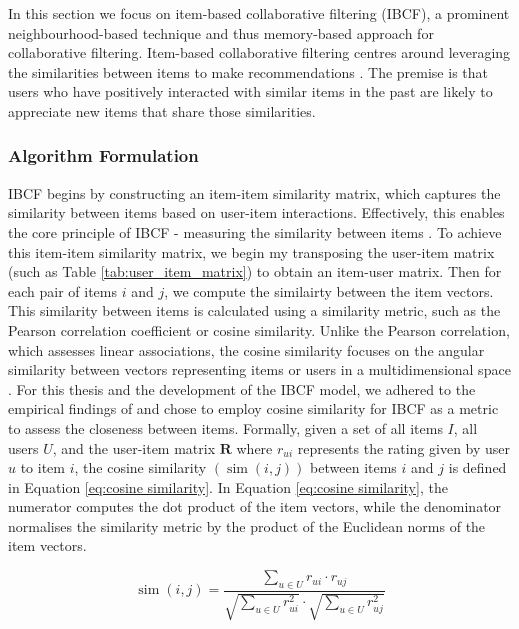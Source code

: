In this section we focus on item-based collaborative filtering (IBCF), a prominent neighbourhood-based technique and thus memory-based approach for collaborative filtering. Item-based collaborative filtering centres around leveraging the similarities between items to make recommendations \cite{linden2001collaborative}. The premise is that users who have positively interacted with similar items in the past are likely to appreciate new items that share those similarities.

\subsubsection{Algorithm Formulation}
\label{subsubsec:4 Algorithm Formulation IB}

IBCF begins by constructing an item-item similarity matrix, which captures the similarity between items based on user-item interactions. Effectively, this enables the core principle of IBCF - measuring the similarity between items \cite{herlocker2002empirical}. To achieve this item-item similarity matrix, we begin my transposing the user-item matrix (such as Table \ref{tab:user_item_matrix}) to obtain an item-user matrix. Then for each pair of items $i$ and $j$, we compute the similairty between the item vectors. This similarity between items is calculated using a similarity metric, such as the Pearson correlation coefficient or cosine similarity. Unlike the Pearson correlation, which assesses linear associations, the cosine similarity focuses on the angular similarity between vectors representing items or users in a multidimensional space \cite{herlocker2002empirical}. For this thesis and the development of the IBCF model, we adhered to the empirical findings of \cite{herlocker2002empirical} and chose to employ cosine similarity for IBCF as a metric to assess the closeness between items. Formally, given a set of all items $I$, all users $U$, and the user-item matrix $\mathbf{R}$ where $r_{u i}$ represents the rating given by user $u$ to item $i$, the cosine similarity $(\operatorname{sim}(i, j))$ between items $i$ and $j$ is defined in Equation \ref{eq:cosine similarity}. In Equation \ref{eq:cosine similarity}, the numerator computes the dot product of the item vectors, while the denominator normalises the similarity metric by the product of the Euclidean norms of the item vectors. 

\begin{equation}
    \operatorname{sim}(i, j)=\frac{\sum_{u \in U} r_{u i} \cdot r_{u j}}{\sqrt{\sum_{u \in U} r_{u i}^2} \cdot \sqrt{\sum_{u \in U} r_{u j}^2}}
    \label{eq:cosine similarity}
\end{equation}

